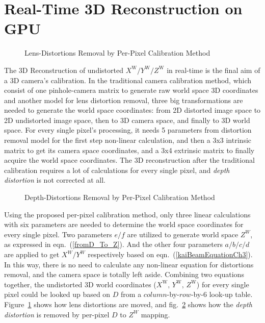 \section{Real-Time 3D Reconstruction on GPU}
%
\begin{figure}[b]
\centering
\hspace*{-0.3cm}
%
%
\caption{Lens-Distortions Removal by Per-Pixel Calibration Method}
\label{perPixelCalibrationBeforeAfter}
\end{figure}%
%
The 3D Reconstruction of undistorted \(X^\text{W}/Y^\text{W}/Z^\text{W}\) in real-time is the final aim of a 3D camera's calibration. In the traditional camera calibration method, which consist of one pinhole-camera matrix to generate raw world space 3D coordinates and another model for lens distortion removal, three big transformations are needed to generate the world space coordinates: from 2D distorted image space to 2D undistorted image space, then to 3D camera space, and finally to 3D world space. For every single pixel's processing, it needs 5 parameters from distortion removal model for the first step non-linear calculation, and then a 3x3 intrinsic matrix to get its camera space coordinates, and a 3x4 extrinsic matrix to finally acquire the world space coordinates. The 3D reconstruction after the traditional calibration requires a lot of calculations for every single pixel, and \emph{depth distortion} is not corrected at all.
\\\indent
\begin{figure}[t]
\centering
\hspace*{-0.3cm}
\qquad%
%
\caption{Depth-Distortions Removal by Per-Pixel Calibration Method}
\label{depthDistortionCalibrationBeforeAfter}
\end{figure}%
%
Using the proposed per-pixel calibration method, only three linear calculations with six parameters are needed to determine the world space coordinates for every single pixel. Two parameters \(e/f\) are utilized to generate world space \(Z^W\), as expressed in eqn.~(\ref{fromD_To_Z}). And the other four parameters \(a/b/c/d\) are applied to get \(X^W/Y^W\) respectively based on eqn.~(\ref{kaiBeamEquationCh3}). In this way, there is no need to calculate any non-linear equation for distortions removal, and the camera space is totally left aside. Combining two equations together, the undistorted 3D world coordinates (\(X^\text{W}, \, Y^\text{W}, \, Z^\text{W}\)) for every single pixel could be looked up based on \(D\) from a \(column\)-by-\(row\)-by-\(6\) look-up table. Figure~\ref{perPixelCalibrationBeforeAfter} shows how lens distortions are moved, and fig.~\ref{depthDistortionCalibrationBeforeAfter} shows how the \emph{depth distortion} is removed by per-pixel \(D\) to \(Z^W\) mapping.
